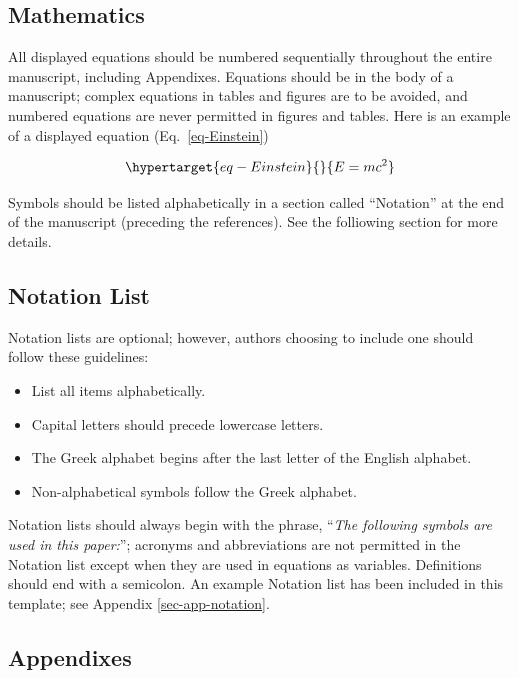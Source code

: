 \documentclass[
  NewProceedings,
  letterpaper]{./assets/ascelike-new}
\begin{document}
\hypertarget{mathematics}{%
\subsection{Mathematics}\label{mathematics}}

All displayed equations should be numbered sequentially throughout the
entire manuscript, including Appendixes. Equations should be in the body
of a manuscript; complex equations in tables and figures are to be
avoided, and numbered equations are never permitted in figures and
tables. Here is an example of a displayed equation
(Eq.~\ref{eq-Einstein})

\begin{equation}\protect\hypertarget{eq-Einstein}{}{
E = m c^{2}
}\label{eq-Einstein}\end{equation}

Symbols should be listed alphabetically in a section called ``Notation''
at the end of the manuscript (preceding the references). See the
folliowing section for more details.

\hypertarget{notation-list}{%
\subsection{Notation List}\label{notation-list}}

Notation lists are optional; however, authors choosing to include one
should follow these guidelines:

\begin{itemize}
\item
  List all items alphabetically.
\item
  Capital letters should precede lowercase letters.
\item
  The Greek alphabet begins after the last letter of the English
  alphabet.
\item
  Non-alphabetical symbols follow the Greek alphabet.
\end{itemize}

Notation lists should always begin with the phrase, ``\emph{The
following symbols are used in this paper:}''; acronyms and abbreviations
are not permitted in the Notation list except when they are used in
equations as variables. Definitions should end with a semicolon. An
example Notation list has been included in this template; see Appendix
\ref{sec-app-notation}.

\hypertarget{appendixes}{%
\subsection{Appendixes}\label{appendixes}}
\end{document}
